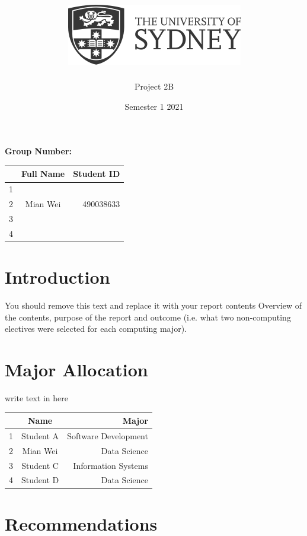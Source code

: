 \documentclass[12pt]{article}
\title{\includegraphics[scale=.5]{usydlogo.png}
\linebreak \\
\noindent \scalebox{1}{\helveticafamily INFO1111: Computing 1A Professionalism}
}
\date{Semester 1 2021}
\author{Project 2B}
\begin{document}
\maketitle
\begin{center}
    \textbf{Group Number:}
\end{center}


\begin{center}
\begin{tabular}{|l|c|r|}
\hline
  & Full Name & Student ID \\ \hline
1 &           &            \\ \hline
2 & Mian Wei  & 490038633  \\ \hline
3 &           &            \\ \hline
4 &           &            \\ \hline
\end{tabular}
\end{center}

\thispagestyle{empty}
\newpage

\tableofcontents %

\setcounter{page}{1}
\newpage
\section{Introduction}
You should remove this text and replace it with your report contents
Overview of the contents, purpose of the report and outcome (i.e. what two non-computing electives were selected for each computing major).

\newpage
\section{Major Allocation}
write text in here
\begin{center}
\begin{tabular}{|l|c|r|}
\hline
  & Name      & Major                \\ \hline
1 & Student A & Software Development \\ \hline
2 & Mian Wei  & Data Science         \\ \hline
3 & Student C & Information Systems  \\ \hline
4 & Student D & Data Science         \\ \hline
\end{tabular}
\end{center}

\newpage
\section{Recommendations}
\end{document}
